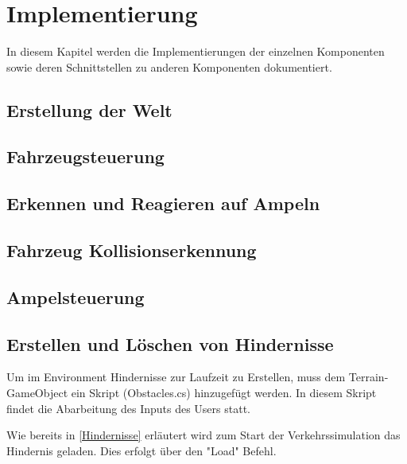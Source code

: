
\chapter{Implementierung}
\label{Implementierung}

In diesem Kapitel werden die Implementierungen der einzelnen Komponenten sowie deren Schnittstellen zu anderen Komponenten dokumentiert.

\thispagestyle{standard}
\pagestyle{standard}

\section{Erstellung der Welt}
\label{Erstellung der Welt}

\section{Fahrzeugsteuerung}
\label{Fahrzeugsteuerung}

\section{Erkennen und Reagieren auf Ampeln}
\label{Erkennen und Reagieren auf Ampeln}

\section{Fahrzeug Kollisionserkennung}
\label{Fahrzeug Kollisionserkennung}


\section{Ampelsteuerung}
\label{Ampelsteuerung}

\section{Erstellen und Löschen von Hindernisse}

Um im Environment Hindernisse zur Laufzeit zu Erstellen, muss dem Terrain-GameObject ein Skript (Obstacles.cs) hinzugefügt werden. In diesem Skript findet die Abarbeitung des Inputs des Users statt.

Wie bereits in \ref{Hindernisse} erläutert wird zum Start der Verkehrssimulation das Hindernis geladen. Dies erfolgt über den "Load" Befehl.

